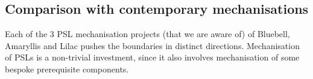 

\subsection{Comparison with contemporary mechanisations}
Each of the 3 PSL mechanisation projects (that we are aware of) of Bluebell, Amaryllis and Lilac pushes the boundaries in distinct directions. Mechanisation of
PSLs is a non-trivial investment, since it also involves mechanisation of some bespoke prerequisite components.

